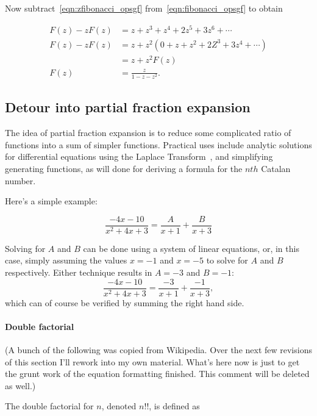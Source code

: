 \documentclass{article}
\begin{document}
Now subtract~\ref{eqn:zfibonacci_opsgf} from~\ref{eqn:fibonacci_opsgf} to
obtain

\begin{align}
F(z) - zF(z) & = z + z^3 + z^4 + 2z^5 + 3z^6 +\cdots\\
F(z) - zF(z) & = z + z^2(0 + z + z^2 + 2Z^3 + 3z^4 +\cdots)\\
             & = z + z^2F(z)\\
        F(z) & = \frac{z}{1-z-z^2}.
\end{align}


\subsection{Detour into partial fraction expansion}

The idea of partial fraction expansion is to reduce some
complicated ratio of functions into a sum of simpler functions.
Practical uses include analytic solutions for differential equations
using the Laplace Transform~\cite[p. 347]{nagle:rk1989}, and simplifying
generating functions, as will done for deriving a formula for the
$nth$ Catalan number.

Here's a simple example:

\begin{equation}
\frac{-4x-10}{x^2+4x+3} = \frac{A}{x+1} + \frac{B}{x+3}
\end{equation}

Solving for $A$ and $B$ can be done using a system of linear equations,
or, in this case, simply assuming the values $x = -1$ and $x = -5$
to solve for $A$ and $B$ respectively. Either technique results in $A = -3$ and
$B = -1$:
\begin{equation}
\frac{-4x-10}{x^2+4x+3} = \frac{-3}{x+1} + \frac{-1}{x+3},
\end{equation}
which can of course be verified by summing the right hand side.

\paragraph{Double factorial}

(A bunch of the following was copied from Wikipedia. Over the next few
revisions of this section I'll rework into my own material. What's here
now is just to get the grunt work of the equation formatting finished.
This comment will be deleted as well.)

The double factorial for $n$, denoted $n!!$, is defined as
\end{document}
